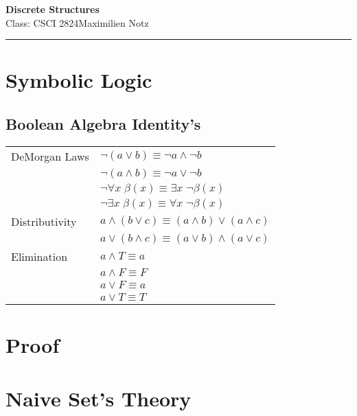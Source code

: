 \documentclass[5pt]{article}
\begin{document}
\begin{center}
     \Large{\textbf{Discrete Structures}}\\
     \small{Class: CSCI 2824}\hfill\small{\textcopyright Maximilien Notz \the\year{}}
     \noindent\rule{20.2cm}{0.4pt}
\end{center}


\begin{multicols}{2}
\setcounter{secnumdepth}{0}


\section{Symbolic Logic}
\subsection{Boolean Algebra Identity's}
\begin{tabular}{ll}
    DeMorgan Laws    & $\lnot(a\lor b)\equiv \lnot a\land\lnot b$\\
                     & $\lnot(a\land b)\equiv \lnot a\lor\lnot b$\\
                     & $\lnot\forall x\;\beta(x)\equiv\exists x\;\lnot\beta(x) $\\
                     & $\lnot\exists x\;\beta(x)\equiv\forall x\;\lnot\beta(x) $\\
    Distributivity   & $a\land(b\lor c)\equiv(a\land b)\lor(a\land c)$\\
                     & $a\lor(b\land c)\equiv(a\lor b)\land(a\lor c)$\\
    Elimination      & $a\land T\equiv a$\\
                     & $a\land F\equiv F$\\
                     & $a\lor F\equiv a$\\
                     & $a\lor T\equiv T$\\
\end{tabular}

\section{Proof}
\section{Naive Set's Theory}

\end{multicols}
\end{document}
